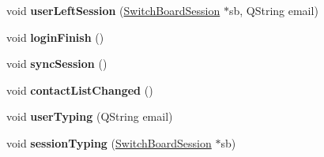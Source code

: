\begin{DoxyCompactItemize}
\item 
\hypertarget{classMsn_a9a2568f2b5308fad5bbdfcbb97c55c5a}{
void {\bfseries userLeftSession} (\hyperlink{classSwitchBoardSession}{SwitchBoardSession} $\ast$sb, QString email)}
\label{classMsn_a9a2568f2b5308fad5bbdfcbb97c55c5a}

\item 
\hypertarget{classMsn_af2b3d9a81e0b2b5b8e25e7492e17deb1}{
void {\bfseries loginFinish} ()}
\label{classMsn_af2b3d9a81e0b2b5b8e25e7492e17deb1}

\item 
\hypertarget{classMsn_a8a40e2fbfd9778cfad9ea90518378b7f}{
void {\bfseries syncSession} ()}
\label{classMsn_a8a40e2fbfd9778cfad9ea90518378b7f}

\item 
\hypertarget{classMsn_adb9fe086f63745ccde55ee68bb4ac8f7}{
void {\bfseries contactListChanged} ()}
\label{classMsn_adb9fe086f63745ccde55ee68bb4ac8f7}

\item 
\hypertarget{classMsn_a5170af24615e113721c74f411f8a26bd}{
void {\bfseries userTyping} (QString email)}
\label{classMsn_a5170af24615e113721c74f411f8a26bd}

\item 
\hypertarget{classMsn_a7666637d86bb1ded43677d2d6659218b}{
void {\bfseries sessionTyping} (\hyperlink{classSwitchBoardSession}{SwitchBoardSession} $\ast$sb)}
\label{classMsn_a7666637d86bb1ded43677d2d6659218b}

\end{DoxyCompactItemize}
